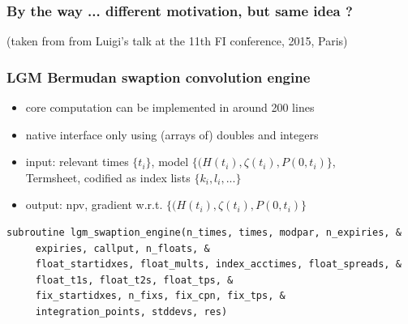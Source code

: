 \documentclass[10pt,German]{beamer}
\begin{document}
\begin{frame}[fragile]
\frametitle{By the way ... different motivation, but same idea ?}
(taken from from Luigi's talk at the 11th FI conference, 2015, Paris)
\end{frame}

\begin{frame}[fragile]
\frametitle{LGM Bermudan swaption convolution engine}
\begin{itemize}
\item core computation can be implemented in around 200 lines
\item native interface only using (arrays of) doubles and integers
\item input: relevant times $\{t_i\}$, model $\{(H(t_i), \zeta(t_i), P(0,t_i)\}$,\\
Termsheet, codified as index lists $\{k_i, l_i, ...\}$
\item output: npv, gradient w.r.t. $\{(H(t_i), \zeta(t_i), P(0,t_i)\}$
\end{itemize}
\begin{verbatim}
subroutine lgm_swaption_engine(n_times, times, modpar, n_expiries, &
     expiries, callput, n_floats, &
     float_startidxes, float_mults, index_acctimes, float_spreads, &
     float_t1s, float_t2s, float_tps, &
     fix_startidxes, n_fixs, fix_cpn, fix_tps, &
     integration_points, stddevs, res)
\end{verbatim}
\end{frame}
\end{document}

